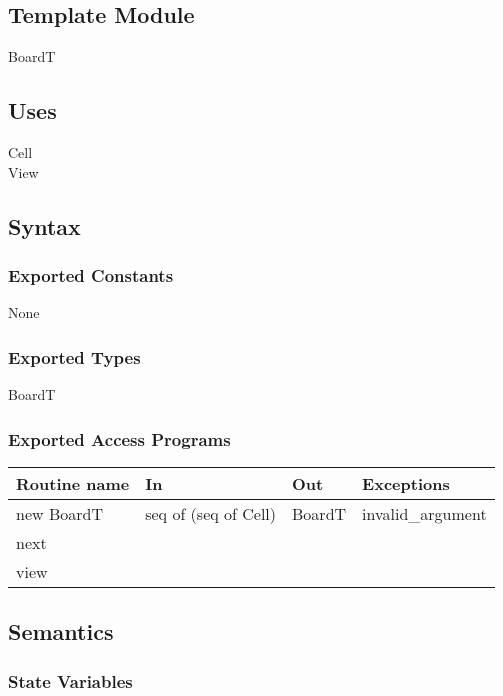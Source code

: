 \documentclass[12pt]{article}
\begin{document}
\subsection*{Template Module}

BoardT

\subsection* {Uses}

\noindent Cell\\
\noindent View

\subsection* {Syntax}

\subsubsection* {Exported Constants}

None

\subsubsection* {Exported Types}

BoardT

\subsubsection* {Exported Access Programs}

\begin{tabular}{| l | l | l | l |}
\hline
\textbf{Routine name} & \textbf{In} & \textbf{Out} & \textbf{Exceptions}\\
\hline
new BoardT  & seq of (seq of Cell) & BoardT & invalid\_argument\\
\hline
next & & &\\
\hline
view & & &\\
\hline

\hline
\end{tabular}

\subsection* {Semantics}

\subsubsection* {State Variables}
\end{document}
